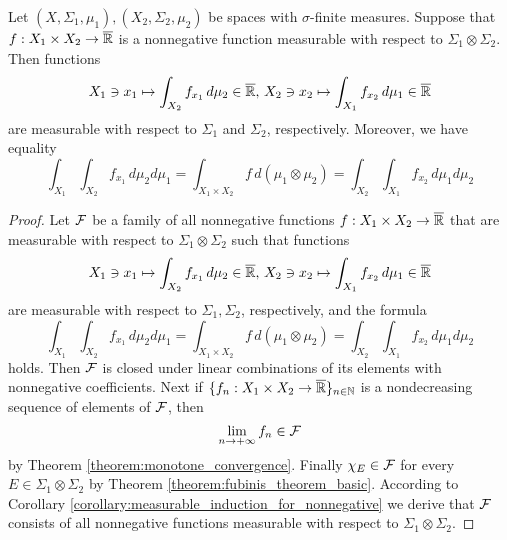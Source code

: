\begin{theorem}\label{theorem:Tonellis_theorem_for_measurable_functions}
Let $(X,\Sigma_1,\mu_1), (X_2,\Sigma_2,\mu_2)$ be spaces with $\sigma$-finite measures. Suppose that $f:X_1\times X_2\rightarrow \overline{{\mathbb R}}$ is a nonnegative function measurable with respect to $\Sigma_1\otimes \Sigma_2$. Then functions
$$X_1\ni x_1 \mapsto \int_{X_2}f_{x_1}\,d\mu_2\in \overline{{\mathbb R}},\,X_2\ni x_2 \mapsto \int_{X_1}f_{x_2}\,d\mu_1\in \overline{{\mathbb R}}$$
are measurable with respect to $\Sigma_1$ and $\Sigma_2$, respectively. Moreover, we have equality
$$\int_{X_1}\int_{X_2}f_{x_1}\,d\mu_2d\mu_1 = \int_{X_1\times X_2}f\,d(\mu_1\otimes \mu_2) = \int_{X_2}\int_{X_1}f_{x_2}\,d\mu_1d\mu_2$$
\end{theorem}
\begin{proof}
Let ${\mathcal F}$ be a family of all nonnegative functions $f:X_1\times X_2\rightarrow \overline{{\mathbb R}}$ that are measurable with respect to $\Sigma_1\otimes \Sigma_2$ such that functions
$$X_1\ni x_1\mapsto \int_{X_2}f_{x_1}\,d\mu_2\in \overline{{\mathbb R}},\,X_2\ni x_2\mapsto \int_{X_1}f_{x_2}\,d\mu_1\in \overline{{\mathbb R}}$$
are measurable with respect to $\Sigma_1, \Sigma_2$, respectively, and the formula
$$\int_{X_1}\int_{X_2}f_{x_1}\,d\mu_2d\mu_1 = \int_{X_1\times X_2}f\,d(\mu_1\otimes \mu_2) = \int_{X_2}\int_{X_1}f_{x_2}\,d\mu_1d\mu_2$$
holds. Then ${\mathcal F}$ is closed under linear combinations of its elements with nonnegative coefficients. Next if $\{f_n:X_1\times X_2\rightarrow \overline{{\mathbb R}}\}_{n\in {\mathbb N}}$ is a nondecreasing sequence of elements of ${\mathcal F}$, then
$$\lim_{n\rightarrow +\infty}f_n\in {\mathcal F}$$
by Theorem \ref{theorem:monotone_convergence}. Finally $\chi_E\in {\mathcal F}$ for every $E\in \Sigma_1\otimes \Sigma_2$ by Theorem \ref{theorem:fubinis_theorem_basic}. According to Corollary \ref{corollary:measurable_induction_for_nonnegative} we derive that ${\mathcal F}$ consists of all nonnegative functions measurable with respect to $\Sigma_1\otimes \Sigma_2$.
\end{proof}

